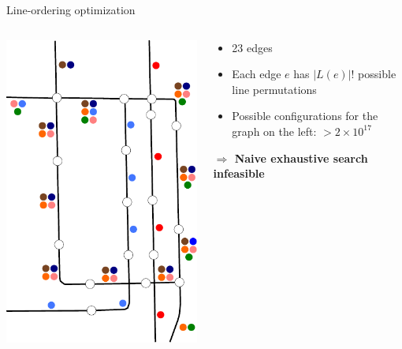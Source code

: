 \documentclass{beamer}
\begin{document}
\begin{frame}{Line-ordering optimization}
	\begin{columns}[T]
		\begin{column}{0.3\textwidth}
			\centering\includegraphics[width=1\textwidth]{figures/chicago_linegraph.pdf}
		\end{column}
		\begin{column}[T]{0.7\textwidth}			
			\begin{itemize}
				\item 23 edges
				\item Each edge $e$ has $|L(e)|!$ possible line permutations
				\item Possible configurations for the graph on the left: \alert{$> 2\times 10^{17}$}
			\end{itemize}
			\textbf{$\Rightarrow$ Naive exhaustive search infeasible}
		\end{column}
	\end{columns}
\end{frame}
\end{document}
